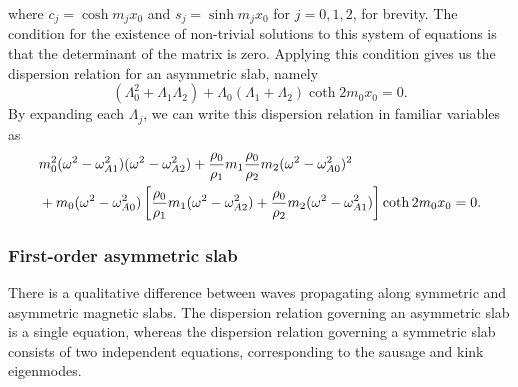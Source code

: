 \documentclass[12pt]{../style-files/ociamthesis}
\begin{document}
where $c_j = \cosh{m_jx_0}$ and $s_j = \sinh{m_jx_0}$ for $j=0,1,2$, for brevity. The condition for the existence of non-trivial solutions to this system of equations is that the determinant of the matrix is zero. Applying this condition gives us the dispersion relation for an asymmetric slab, namely
\begin{equation}
(\Lambda_0^2 + \Lambda_1\Lambda_2) + \Lambda_0(\Lambda_1 + \Lambda_2)\coth{2m_0x_0} = 0. \label{DR lambda}
\end{equation}
By expanding each $\Lambda_j$, we can write this dispersion relation in familiar variables as
\begin{align}
&m_0^2(\omega^2 - \omega_{A1}^2)(\omega^2 - \omega_{A2}^2) + \frac{\rho_0}{\rho_1}m_1\frac{\rho_0}{\rho_2}m_2(\omega^2 - \omega_{A0}^2)^2 \notag \\
& + m_0(\omega^2 - \omega_{A0}^2)\left[\frac{\rho_0}{\rho_1}m_1(\omega^2 - \omega_{A2}^2) + \frac{\rho_0}{\rho_2}m_2(\omega^2 - \omega_{A1}^2)\right]\coth{2m_0x_0} = 0. \label{DR}
\end{align}


\subsubsection{First-order asymmetric slab}

There is a qualitative difference between waves propagating along symmetric and asymmetric magnetic slabs. The dispersion relation governing an asymmetric slab is a single equation, whereas the dispersion relation governing a symmetric slab \citep{rob81a} consists of two independent equations, corresponding to the sausage and kink eigenmodes.
\end{document}

